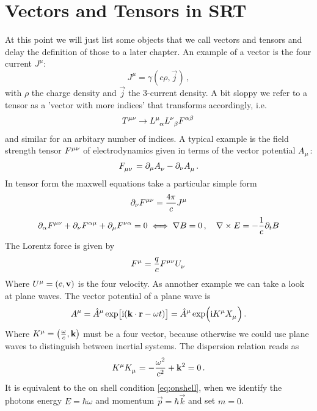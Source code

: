 \section{Vectors and Tensors in SRT} 
At this point we will just list some objects that we call vectors and tensors
and delay the definition of those to a later chapter.
An example of a vector is the four current $J^\mu$:
\begin{equation}
J^\mu=\gamma(c\rho,\vec{j})\, ,
\end{equation}
with $\rho$ the charge density and $\vec{j}$ the 3-current density. A bit sloppy
we refer to a tensor as a 'vector with more indices' that transforms
accordingly, i.e.
\begin{equation}
\tensor{T}{^\mu^\nu}\to
\tensor{L}{^\mu_\alpha}\tensor{L}{^\nu_\beta}\tensor{F}{^\alpha^\beta}\, 
\end{equation}
and similar for an arbitary number of indices. A typical example is the field
strength tensor $\tensor{F}{^\mu^\nu}$ of electrodynamics given in terms of the
vector potential $\tensor{A}{_\mu}$:
\begin{equation}
\tensor{F}{_\mu_\nu}=\partial_\mu\tensor{A}{_\nu}-\partial_\nu\tensor{A}{_\mu}\,
.
\end{equation}
In tensor form the maxwell equations take a particular simple form
\begin{equation}
\partial_\nu\tensor{F}{^\mu^\nu}=\frac{4\pi}{c}\tensor{J}{^\mu}
\end{equation}
\begin{equation}
\partial_\alpha\tensor{F}{^\mu^\nu}
+\partial_\nu\tensor{F}{^\alpha^\mu}
+\partial_\mu\tensor{F}{^\nu^\alpha}=0
\iff \nabla B=0\, , \quad \nabla\times E=-\frac{1}{c}\partial_t B
\end{equation}
The Lorentz force is given by
\begin{equation}
\tensor{F}{^\mu}=\frac{q}{c}\tensor{F}{^\mu^\nu}\tensor{U}{_\nu}
\end{equation} 
Where $\tensor{U}{^\mu}=(c,\vec{v})$ is the four velocity. As annother example
we can take a look at plane waves. The vector potential of a plane wave is
\begin{equation}
\tensor{A}{^\mu}=\tensor{\hat{A}}{^\mu}
\exp\left[\imI(\vec{k}\cdot\vec{r}-\omega
t)\right]
=\tensor{\hat{A}}{^\mu}\exp\left(\imI\tensor{K}{^\mu} \tensor{X}{_\mu}\right)\,
.
\end{equation}
Where $\tensor{K}{^\mu}=\left(\frac{\omega}{c},\vec{k}\right)$ must be a four
vector, because otherwise we could use plane waves to distinguish between
inertial systems. The dispersion relation reads as
\begin{equation}
\tensor{K}{^\mu}\tensor{K}{_\mu}=-\frac{\omega^2}{c^2}+\vec{k}^2=0\, .
\end{equation}
It is equivalent to the on shell condition \eqref{eq:onshell}, when we identify
the photons energy $E=\hbar\omega$ and momentum $\vec{p}=\hbar\vec{k}$ and set
$m=0$.
